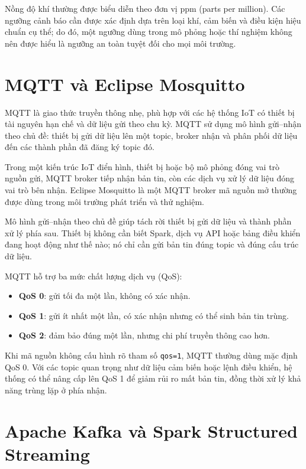 Nồng độ khí thường được biểu diễn theo đơn vị ppm (parts per million). Các ngưỡng cảnh báo cần được xác định dựa trên loại khí, cảm biến và điều kiện hiệu chuẩn cụ thể; do đó, một ngưỡng dùng trong mô phỏng hoặc thí nghiệm không nên được hiểu là ngưỡng an toàn tuyệt đối cho mọi môi trường.

\section{MQTT và Eclipse Mosquitto}


MQTT là giao thức truyền thông nhẹ, phù hợp với các hệ thống IoT có thiết bị tài nguyên hạn chế và dữ liệu gửi theo chu kỳ. MQTT sử dụng mô hình gửi--nhận theo chủ đề: thiết bị gửi dữ liệu lên một topic, broker nhận và phân phối dữ liệu đến các thành phần đã đăng ký topic đó.

Trong một kiến trúc IoT điển hình, thiết bị hoặc bộ mô phỏng đóng vai trò nguồn gửi, MQTT broker tiếp nhận bản tin, còn các dịch vụ xử lý dữ liệu đóng vai trò bên nhận. Eclipse Mosquitto là một MQTT broker mã nguồn mở thường được dùng trong môi trường phát triển và thử nghiệm.

Mô hình gửi--nhận theo chủ đề giúp tách rời thiết bị gửi dữ liệu và thành phần xử lý phía sau. Thiết bị không cần biết Spark, dịch vụ API hoặc bảng điều khiển đang hoạt động như thế nào; nó chỉ cần gửi bản tin đúng topic và đúng cấu trúc dữ liệu.

MQTT hỗ trợ ba mức chất lượng dịch vụ (QoS):

\begin{itemize}
  \item \textbf{QoS 0}: gửi tối đa một lần, không có xác nhận.
  \item \textbf{QoS 1}: gửi ít nhất một lần, có xác nhận nhưng có thể sinh bản tin trùng.
  \item \textbf{QoS 2}: đảm bảo đúng một lần, nhưng chi phí truyền thông cao hơn.
\end{itemize}

Khi mã nguồn không cấu hình rõ tham số \texttt{qos=1}, MQTT thường dùng mặc định QoS 0. Với các topic quan trọng như dữ liệu cảm biến hoặc lệnh điều khiển, hệ thống có thể nâng cấp lên QoS 1 để giảm rủi ro mất bản tin, đồng thời xử lý khả năng trùng lặp ở phía nhận.

\section{Apache Kafka và Spark Structured Streaming}

